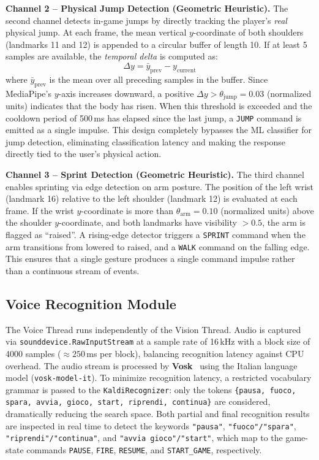 \documentclass[10pt,twocolumn,a4paper]{article}
\begin{document}
	\vspace{4pt}
	\noindent\textbf{Channel 2 -- Physical Jump Detection (Geometric Heuristic).}
	The second channel detects in-game jumps by directly tracking the player's \emph{real} physical jump. At each frame, the mean vertical $y$-coordinate of both shoulders (landmarks 11 and 12) is appended to a circular buffer of length 10. If at least 5 samples are available, the \emph{temporal delta} is computed as:
	\[
		\Delta y = \bar{y}_{\text{prev}} - y_{\text{current}}
	\]
	where $\bar{y}_{\text{prev}}$ is the mean over all preceding samples in the buffer. Since MediaPipe's $y$-axis increases downward, a positive $\Delta y > \theta_{\text{jump}} = 0.03$ (normalized units) indicates that the body has risen. When this threshold is exceeded and the cooldown period of 500\,ms has elapsed since the last jump, a \texttt{JUMP} command is emitted as a single impulse. This design completely bypasses the ML classifier for jump detection, eliminating classification latency and making the response directly tied to the user's physical action.

	\vspace{4pt}
	\noindent\textbf{Channel 3 -- Sprint Detection (Geometric Heuristic).}
	The third channel enables sprinting via edge detection on arm posture. The position of the left wrist (landmark 16) relative to the left shoulder (landmark 12) is evaluated at each frame. If the wrist $y$-coordinate is more than $\theta_{\text{arm}} = 0.10$ (normalized units) above the shoulder $y$-coordinate, and both landmarks have visibility $> 0.5$, the arm is flagged as ``raised''. A rising-edge detector triggers a \texttt{SPRINT} command when the arm transitions from lowered to raised, and a \texttt{WALK} command on the falling edge. This ensures that a single gesture produces a single command impulse rather than a continuous stream of events.

	\subsection{Voice Recognition Module}

	The Voice Thread runs independently of the Vision Thread. Audio is captured via \texttt{sounddevice.RawInputStream} at a sample rate of 16\,kHz with a block size of 4000 samples ($\approx 250$\,ms per block), balancing recognition latency against CPU overhead. The audio stream is processed by \textbf{Vosk}~\cite{povey2011kaldi} using the Italian language model (\texttt{vosk-model-it}). To minimize recognition latency, a restricted vocabulary grammar is passed to the \texttt{KaldiRecognizer}: only the tokens \texttt{\{pausa, fuoco, spara, avvia, gioco, start, riprendi, continua\}} are considered, dramatically reducing the search space. Both partial and final recognition results are inspected in real time to detect the keywords \texttt{"pausa"}, \texttt{"fuoco"/"spara"}, \texttt{"riprendi"/"continua"}, and \texttt{"avvia gioco"/"start"}, which map to the game-state commands \texttt{PAUSE}, \texttt{FIRE}, \texttt{RESUME}, and \texttt{START\_GAME}, respectively.
\end{document}

